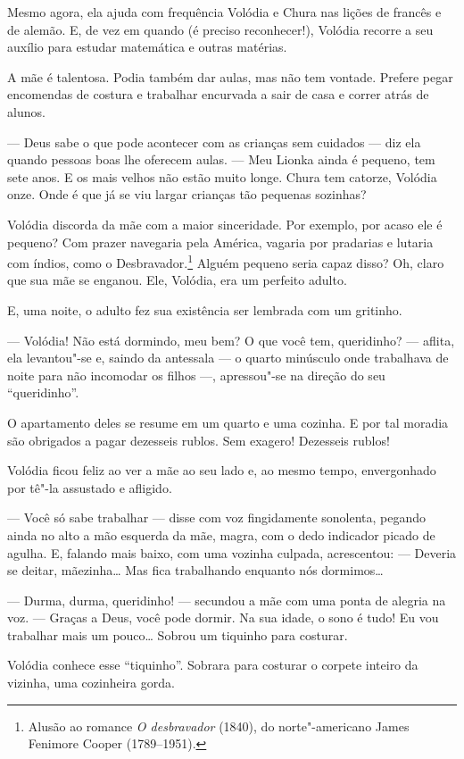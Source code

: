 Mesmo agora, ela ajuda com frequência Volódia e Chura nas lições de
francês e de alemão. E, de vez em quando (é preciso reconhecer!),
Volódia recorre a seu auxílio para estudar matemática e outras matérias.

A mãe é talentosa. Podia também dar aulas, mas não tem vontade. Prefere
pegar encomendas de costura e trabalhar encurvada a sair de casa e
correr atrás de alunos.

--- Deus sabe o que pode acontecer com as crianças sem cuidados --- diz
ela quando pessoas boas lhe oferecem aulas. --- Meu Lionka ainda é
pequeno, tem sete anos. E os mais velhos não estão muito longe. Chura
tem catorze, Volódia onze. Onde é que já se viu largar crianças
tão pequenas sozinhas?

Volódia discorda da mãe com a maior sinceridade. Por exemplo, por acaso
ele é pequeno? Com prazer navegaria pela América, vagaria por pradarias
e lutaria com índios, como o Desbravador.\footnote{Alusão ao romance
  \emph{O desbravador} (1840), do norte"-americano James Fenimore Cooper
  (1789--1951).} Alguém pequeno seria capaz disso? Oh, claro que sua mãe
se enganou. Ele, Volódia, era um perfeito adulto.

E, uma noite, o adulto fez sua existência ser lembrada com um gritinho.

--- Volódia! Não está dormindo, meu bem? O que você tem, queridinho? ---
aflita, ela levantou"-se e, saindo da antessala --- o quarto minúsculo onde
trabalhava de noite para não incomodar os filhos ---, apressou"-se na direção do seu
``queridinho''.

O apartamento deles se resume em um quarto e uma cozinha. E por tal
moradia são obrigados a pagar dezesseis rublos. Sem exagero! Dezesseis
rublos!

Volódia ficou feliz ao ver a mãe ao seu lado e, ao mesmo tempo,
envergonhado por tê"-la assustado e afligido.

--- Você só sabe trabalhar --- disse com voz fingidamente sonolenta,
pegando ainda no alto a mão esquerda da mãe, magra, com o dedo indicador
picado de agulha. E, falando mais baixo, com uma vozinha culpada,
acrescentou: --- Deveria se deitar, mãezinha\ldots{} Mas fica trabalhando
enquanto nós dormimos\ldots{}

--- Durma, durma, queridinho! --- secundou a mãe com uma ponta de
alegria na voz. --- Graças a Deus, você pode dormir. Na sua idade, o
sono é tudo! Eu vou trabalhar mais um pouco\ldots{} Sobrou um
tiquinho para costurar.

Volódia conhece esse ``tiquinho''. Sobrara para costurar o corpete
inteiro da vizinha, uma cozinheira gorda.

